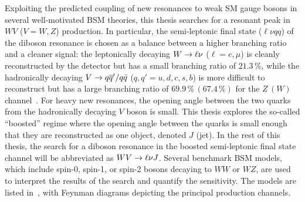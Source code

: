 Exploiting the predicted coupling of new resonances to weak SM gauge bosons in several well-motivated BSM theories, this thesis searches for a resonant peak in $WV$ ($V=W,Z$) production. In particular, the semi-leptonic final state ($\ell\nu qq$) of the diboson resonance is chosen as a balance between a higher branching ratio and a cleaner signal: the leptonically decaying $W\rightarrow \ell\nu$ ($\ell = e, \mu$) is cleanly reconstructed by the detector but has a small branching ratio of $21.3\,\%$, while the hadronically decaying $V\rightarrow q\overline{q}'/q\bar{q}$ ($q,q'=u,d,c,s,b$) is more difficult to reconstruct but has a large branching ratio of $69.9\,\%\, (67.4\,\%)$ for the $Z\, (W)$ channel~\cite{pdg_2017}.
For heavy new resonances, the opening angle between the two quarks from the hadronically decaying $V$ boson is small.  This thesis explores the so-called ``boosted'' regime where the opening angle between the quarks is small enough that they are reconstructed as one object, denoted $J$ (jet). In the rest of this thesis, the search for a diboson resonance in the boosted semi-leptonic final state channel will be abbreviated as $WV\rightarrow \ell\nu J$.
Several benchmark BSM models, which include spin-0, spin-1, or spin-2 bosons decaying to $WW$ or $WZ$, are used to interpret the results of the search and quantify the sensitivity. The models are listed in~\Tab{\ref{tab:bench_models}}, with Feynman diagrams depicting the principal production channels. 

